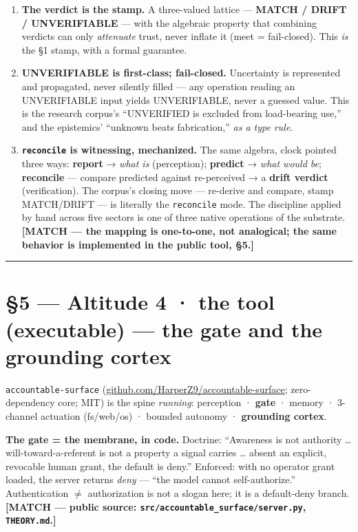 \documentclass[11pt]{article}
\begin{document}
\begin{enumerate}
\item \textbf{The verdict is the stamp.} A three-valued lattice — \textbf{MATCH /\allowbreak{} DRIFT /\allowbreak{} UNVERIFIABLE} — with the algebraic property that combining verdicts can only \emph{attenuate} trust, never inflate it (meet = fail-closed). This \emph{is} the §1 stamp, with a formal guarantee.
\item \textbf{UNVERIFIABLE is first-class; fail-closed.} Uncertainty is represented and propagated, never silently filled — any operation reading an UNVERIFIABLE input yields UNVERIFIABLE, never a guessed value. This is the research corpus's ``UNVERIFIED is excluded from load-bearing use,'' and the epistemics' ``unknown beats fabrication,'' \emph{as a type rule}.
\item \textbf{\texttt{reconcile} is witnessing, mechanized.} The same algebra, clock pointed three ways: \textbf{report} → \emph{what is} (perception); \textbf{predict} → \emph{what would be}; \textbf{reconcile} — compare predicted against re-perceived → a \textbf{drift verdict} (verification). The corpus's closing move — re-derive and compare, stamp MATCH/\allowbreak{}DRIFT — is literally the \texttt{reconcile} mode. The discipline applied by hand across five sectors is one of three native operations of the substrate. \textbf{[MATCH — the mapping is one-to-one, not analogical; the same behavior is implemented in the public tool, §5.]}
\end{enumerate}

\medskip\noindent\rule{\linewidth}{0.3pt}\medskip

\section*{§5 — Altitude 4 · the tool (executable) — the gate and the grounding cortex}

\texttt{accountable-surface} (\href{https://github.com/HarperZ9/accountable-surface}{github.com/\allowbreak{}HarperZ9/\allowbreak{}accountable-surface}; zero-dependency core; MIT) is the spine \emph{running}: perception · \textbf{gate} · memory · 3-channel actuation (fs/\allowbreak{}web/\allowbreak{}os) · bounded autonomy · \textbf{grounding cortex}.

\textbf{The gate = the membrane, in code.} Doctrine: ``Awareness is not authority … will-toward-a-referent is not a property a signal carries … absent an explicit, revocable human grant, the default is deny.'' Enforced: with no operator grant loaded, the server returns \emph{deny} — ``the model cannot self-authorize.'' Authentication \ensuremath{\neq} authorization is not a slogan here; it is a default-deny branch. \textbf{[MATCH — public source: \texttt{src/accountable\_surface/server.py}, \texttt{THEORY.md}.]}
\end{document}
